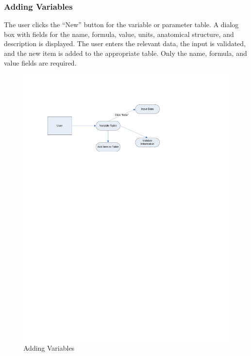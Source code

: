 \documentclass{article}
\begin{document}
\subsubsection{Adding Variables}
The user clicks the ``New'' button for the variable or parameter table. A dialog box with fields for the name, formula, value, units, anatomical structure, and description is displayed. The user enters the relevant data, the input is validated, and the new item is added to the appropriate table. Only the name, formula, and value fields are required.
\begin{figure}[!htb]
\centering
\includegraphics[width=\textwidth]{./diagrams/new-var}
\caption{Adding Variables}
\end{figure}
\end{document}
